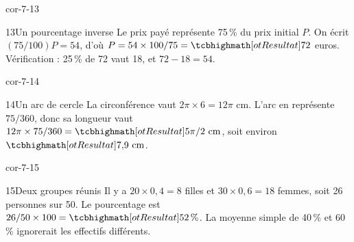 \begin{blocLivre}{cor-7-13}\begin{corrige}{13}{Un pourcentage inverse}
Le prix payé représente 75\,\% du prix initial $P$. On écrit $(75/100)P=54$, d’où $P=54\times100/75=\res{72}$ euros. Vérification : 25\,\% de 72 vaut 18, et $72-18=54$.
\end{corrige}\end{blocLivre}
\begin{blocLivre}{cor-7-14}\begin{corrige}{14}{Un arc de cercle}
La circonférence vaut $2\pi\times6=12\pi$ cm. L’arc en représente $75/360$, donc sa longueur vaut $12\pi\times75/360=\res{5\pi/2\ \mathrm{cm}}$, soit environ $\res{7{,}9\ \mathrm{cm}}$.
\label{fig-cor-7-14}
\end{corrige}\end{blocLivre}
\begin{blocLivre}{cor-7-15}\begin{corrige}{15}{Deux groupes réunis}
Il y a $20\times0{,}4=8$ filles et $30\times0{,}6=18$ femmes, soit 26 personnes sur 50. Le pourcentage est $26/50\times100=\res{52\,\%}$. La moyenne simple de 40\,\% et 60\,\% ignorerait les effectifs différents.
\end{corrige}\end{blocLivre}
